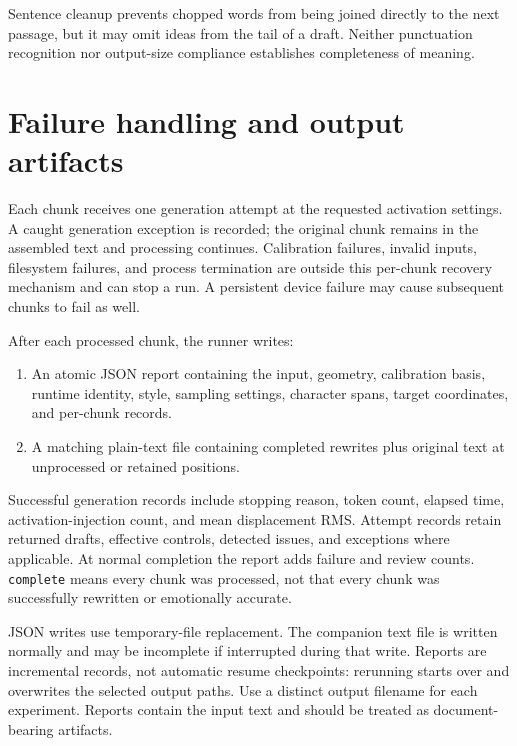 \documentclass[manuscript,screen,nonacm]{acmart}
\providecommand{\tightlist}{\setlength{\itemsep}{0pt}\setlength{\parskip}{0pt}}
\begin{document}
Sentence cleanup prevents chopped words from being joined directly to
the next passage, but it may omit ideas from the tail of a draft.
Neither punctuation recognition nor output-size compliance establishes
completeness of meaning.

\section{Failure handling and output
artifacts}\label{failure-handling-and-output-artifacts}

Each chunk receives one generation attempt at the requested activation
settings. A caught generation exception is recorded; the original chunk
remains in the assembled text and processing continues. Calibration
failures, invalid inputs, filesystem failures, and process termination
are outside this per-chunk recovery mechanism and can stop a run. A
persistent device failure may cause subsequent chunks to fail as well.

After each processed chunk, the runner writes:

\begin{enumerate}
\def\labelenumi{\arabic{enumi}.}
\tightlist
\item
  An atomic JSON report containing the input, geometry, calibration
  basis, runtime identity, style, sampling settings, character spans,
  target coordinates, and per-chunk records.
\item
  A matching plain-text file containing completed rewrites plus original
  text at unprocessed or retained positions.
\end{enumerate}

Successful generation records include stopping reason, token count,
elapsed time, activation-injection count, and mean displacement RMS.
Attempt records retain returned drafts, effective controls, detected
issues, and exceptions where applicable. At normal completion the report
adds failure and review counts. \nolinkurl{complete} means every chunk was
processed, not that every chunk was successfully rewritten or
emotionally accurate.

JSON writes use temporary-file replacement. The companion text file is
written normally and may be incomplete if interrupted during that write.
Reports are incremental records, not automatic resume checkpoints:
rerunning starts over and overwrites the selected output paths. Use a
distinct output filename for each experiment. Reports contain the input
text and should be treated as document-bearing artifacts.
\end{document}
